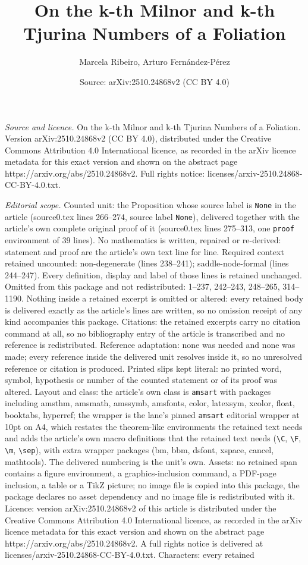 \documentclass[10pt,a4paper]{amsart}
\title[On the k-th Milnor and k-th Tjurina Numbers of a Foliation]{On the k-th Milnor and k-th Tjurina Numbers of a Foliation}
\author{Marcela Ribeiro, Arturo Fern\'andez-P\'erez}
\date{Source: arXiv:2510.24868v2 (CC BY 4.0)}
\begin{document}
\maketitle

\noindent\emph{Source and licence.} On the k-th Milnor and k-th Tjurina Numbers of a Foliation. Version arXiv:2510.24868v2 (CC BY 4.0), distributed under the Creative Commons Attribution 4.0 International licence, as recorded in the arXiv licence metadata for this exact version and shown on the abstract page https://arxiv.org/abs/2510.24868v2. Full rights notice: licenses/arxiv-2510.24868-CC-BY-4.0.txt.\par\smallskip

\noindent\textit{Editorial scope.} Counted unit: the Proposition whose source label is \texttt{None} in the article (source0.tex lines 266--274, source label \texttt{None}), delivered together with the article's own complete original proof of it (source0.tex lines 275--313, one \texttt{proof} environment of 39 lines). No mathematics is written, repaired or re-derived: statement and proof are the article's own text line for line. Required context retained uncounted: non-degenerate (lines 238--241); saddle-node-formal (lines 244--247). Every definition, display and label of those lines is retained unchanged. Omitted from this package and not redistributed: 1--237, 242--243, 248--265, 314--1190. Nothing inside a retained excerpt is omitted or altered: every retained body is delivered exactly as the article's lines are written, so no omission receipt of any kind accompanies this package. Citations: the retained excerpts carry no citation command at all, so no bibliography entry of the article is transcribed and no reference is redistributed. Reference adaptation: none was needed and none was made; every reference inside the delivered unit resolves inside it, so no unresolved reference or citation is produced. Printed slips kept literal: no printed word, symbol, hypothesis or number of the counted statement or of its proof was altered. Layout and class: the article's own class is \texttt{amsart} with packages including amsthm, amsmath, amssymb, amsfonts, color, latexsym, xcolor, float, booktabs, hyperref; the wrapper is the lane's pinned \texttt{amsart} editorial wrapper at 10pt on A4, which restates the theorem-like environments the retained text needs and adds the article's own macro definitions that the retained text needs (\texttt{\textbackslash C}, \texttt{\textbackslash F}, \texttt{\textbackslash m}, \texttt{\textbackslash sep}), with extra wrapper packages (bm, bbm, dsfont, xspace, cancel, mathtools). The delivered numbering is the unit's own. Assets: no retained span contains a figure environment, a graphics-inclusion command, a PDF-page inclusion, a table or a TikZ picture; no image file is copied into this package, the package declares no asset dependency and no image file is redistributed with it. Licence: version arXiv:2510.24868v2 of this article is distributed under the Creative Commons Attribution 4.0 International licence, as recorded in the arXiv licence metadata for this exact version and shown on the abstract page https://arxiv.org/abs/2510.24868v2. A full rights notice is delivered at licenses/arxiv-2510.24868-CC-BY-4.0.txt. Characters: every retained 
\end{document}

